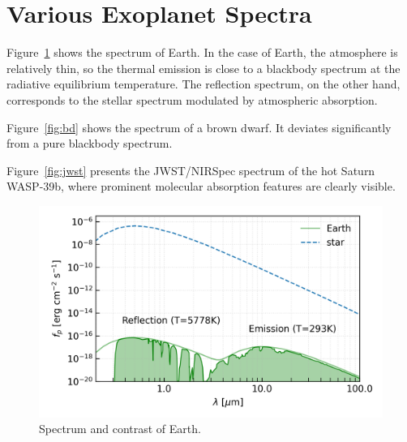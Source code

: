 \section{Various Exoplanet Spectra}

Figure~\ref{fig:earth} shows the spectrum of Earth. In the case of Earth, the atmosphere is relatively thin, so the thermal emission is close to a blackbody spectrum at the radiative equilibrium temperature. The reflection spectrum, on the other hand, corresponds to the stellar spectrum modulated by atmospheric absorption.  

Figure~\ref{fig:bd} shows the spectrum of a brown dwarf. It deviates significantly from a pure blackbody spectrum.  

Figure~\ref{fig:jwst} presents the JWST/NIRSpec spectrum of the hot Saturn WASP-39b, where prominent molecular absorption features are clearly visible.  

\begin{figure}[]
\begin{center}
	\includegraphics[width=\linewidth]{fig/EarthEmis.png}
\end{center}
\caption{Spectrum and contrast of Earth.}
\label{fig:earth}
\end{figure}

